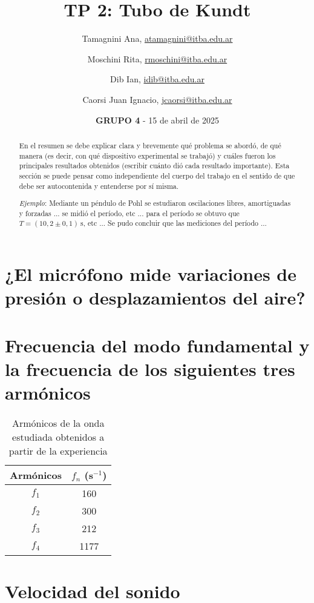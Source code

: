 \documentclass[12pt,a4paper]{article}
\title{TP 2: Tubo de Kundt}
\author{Tamagnini Ana, \href{atamagnini@itba.edu.ar}{atamagnini@itba.edu.ar} 
\and Moschini Rita, \href{rmoschini@itba.edu.ar}{rmoschini@itba.edu.ar}
\and Dib Ian, \href{idin@itba.edu.ar}{idib@itba.edu.ar}
\and Caorsi Juan Ignacio, \href{jcaorsi@itba.edu.ar}{jcaorsi@itba.edu.ar}
}
\date{\textbf{GRUPO 4} - 15 de abril de 2025}
\begin{document}
\maketitle

\begin{abstract}

En el resumen se debe explicar clara y brevemente qué problema se abordó, de qué manera (es decir, con qué dispositivo experimental se trabajó) y cuáles fueron los principales resultados obtenidos (escribir cuánto dió cada resultado importante). Esta sección se puede pensar como independiente del cuerpo del trabajo en el sentido de que debe ser autocontenida y entenderse por sí misma.

\textit{Ejemplo}: Mediante un péndulo de Pohl se estudiaron oscilaciones libres, amortiguadas y forzadas ... se midió el período, etc ... para el período se obtuvo que $T = (10,2 \pm 0,1) \ \mathrm{s}$, etc ... Se pudo concluir que las mediciones del período ...

\end{abstract}

\section{¿El micrófono mide variaciones de presión o desplazamientos del aire?}


\section{Frecuencia del modo fundamental y la frecuencia de los siguientes tres armónicos}

\begin{table}[H]
    \centering
    \begin{tabular}{|c|c|}
    \hline
    \multirow{1}{2.1cm}{\centering Armónicos} 
        & $f_n$ (s$^{-1}$) \\
    \hline
    $f_1$  & 160 \\ \hline
    $f_2$  & 300 \\ \hline
    $f_3$  & 212 \\ \hline
    $f_4$  & 1177  \\ \hline
    \end{tabular}
    \caption{Armónicos de la onda estudiada obtenidos a partir de la experiencia}
    \label{tabla1}
\end{table}

\section{Velocidad del sonido}
\end{document}
